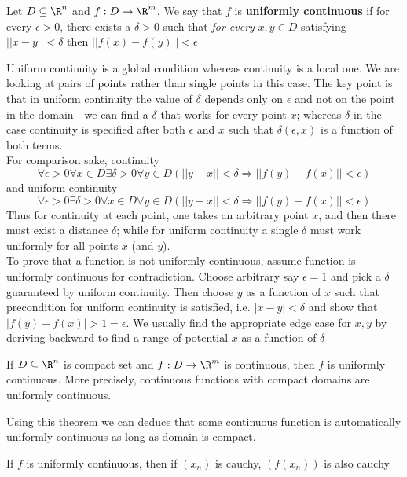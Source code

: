 \documentclass[11pt]{article}
\begin{document}
\begin{defn*}
  Let $D\subseteq \R^n$ and $f: D \to \R^m$, We say that $f$ is \textbf{uniformly continuous} if for every $\epsilon > 0$, there exists a $\delta > 0$ such that \textit{for every} $x,y \in D$ satisfying $|| x-y|| < \delta$ then $||f(x) - f(y)||<\epsilon$
  \begin{rem}
    Uniform continuity is a global condition whereas continuity is a local one. We are looking at pairs of points rather than single points in this case. The key point is that in uniform continuity the value of $\delta$ depends only on $\epsilon$ and not on the point in the domain - we can find a $\delta$ that works for every point $x$; whereas $\delta$ in the case continuity is specified after both $\epsilon$ and $x$ such that $\delta(\epsilon, x)$ is a function of both terms. \\
    For comparison sake, continuity
    \[
      \forall \epsilon > 0 \forall x\in D \exists \delta>0 \forall y\in D (||y-x|| < \delta \Rightarrow ||f(y) - f(x)|| < \epsilon)
    \]
    and uniform continuity
    \[
      \forall \epsilon > 0 \exists \delta>0 \forall x\in D \forall y\in D (||y-x|| < \delta \Rightarrow ||f(y) - f(x)|| < \epsilon)
    \]
    Thus for continuity at each point, one takes an arbitrary point $x$, and then there must exist a distance $\delta$; while for uniform continuity a single $\delta$ must work uniformly for all points $x$ (and $y$).\\
    To prove that a function is not uniformly continuous, assume function is uniformly continuous for contradiction. Choose arbitrary say $\epsilon = 1$ and pick a $\delta$ guaranteed by uniform continuity. Then choose $y$ as a function of $x$ such that precondition for uniform continuity is satisfied, i.e. $|x-y| < \delta$ and show that $| f(y) - f(x)| > 1 = \epsilon$. We usually find the appropriate edge case for $x, y$ by deriving backward to find a range of potential $x$ as a function of $\delta$

    \end{rem}
\end{defn*}

\begin{theorem*}
  If $D\subseteq \R^n$ is compact set and $f: D\to \R^m$ is continuous, then $f$ is uniformly continuous. More precisely, continuous functions with compact domains are uniformly continuous.
  \begin{rem}
    Using this theorem we can deduce that some continuous function is automatically uniformly continuous as long as domain is compact.
  \end{rem}
\end{theorem*}


\begin{theorem*}
  If $f$ is uniformly continuous, then if $(x_n)$ is cauchy, $(f(x_n))$ is also cauchy
\end{theorem*}
\end{document}
